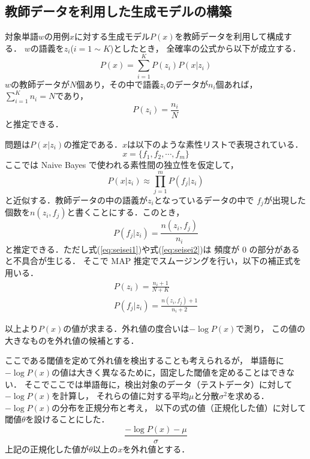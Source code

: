 \documentclass[japanese]{jnlp_1.4}
\begin{document}
\subsection{教師データを利用した生成モデルの構築}

対象単語\( w \)の用例\( x \)に対する生成モデル\( P(x) \)を教師データを利用して構成する．
\( w \)の語義を\( z_i \)(\(i=1 \sim K\))としたとき，
全確率の公式から以下が成立する．
\[
P(x) = \sum_{i=1}^K P(z_i) P(x|z_i)
\]
\( w \)の教師データが\( N \)個あり，その中で語義\( z_i \)のデータが\( n_i \)個あれば，
\( \sum_{i=1}^K n_i = N \)であり，
\begin{equation}
P(z_i) = \frac{n_i}{N}
  \label{eq:seisei1}
\end{equation}
と推定できる．

問題は\( P(x|z_i) \)の推定である．\( x \)は以下のような素性リストで表現されている．
\[
x = \{ f_1, f_2, \cdots, f_m \}
\]
ここでは Naive Bayes で使われる素性間の独立性を仮定して，
\[
P(x|z_i) \approx \prod_{j = 1}^m P(f_j | z_i)
\]
と近似する．教師データの中の語義が\( z_i \)となっているデータの中で
\( f_j \)が出現した個数を\( n(z_i,f_j) \)と書くことにする．このとき，
\begin{equation}
P(f_j | z_i) = \frac{n(z_i,f_j)}{n_i}
  \label{eq:seisei2}
\end{equation}
と推定できる．ただし式(\ref{eq:seisei1})や式(\ref{eq:seisei2})は
頻度が 0 の部分があると不具合が生じる．
そこで MAP 推定でスムージングを行い，以下の補正式を用いる\cite{takamura}．
\begin{gather}
P(z_i) = \frac{n_i + 1}{N + K} \\[0.5em]
P(f_j | z_i) = \frac{n(z_i,f_j) + 1}{n_i + 2}
\end{gather}

以上より\( P(x) \)の値が求まる．外れ値の度合いは\( - \log P(x) \)で測り，
この値の大きなものを外れ値の候補とする．

ここである閾値を定めて外れ値を検出することも考えられるが，
単語毎に\( - \log P(x) \)の値は大きく異なるために，固定した閾値を定めることはできない．
そこでここでは単語毎に，検出対象のデータ（テストデータ）に対して\( - \log P(x) \)を計算し，
それらの値に対する平均\( \mu \)と分散\( \sigma^2 \)を求める．
\( - \log P(x) \)の分布を正規分布と考え，
以下の式の値（正規化した値）に対して閾値\( \theta \)を設けることにした．
\begin{equation}
\frac{- \log P(x) - \mu}{\sigma}  \label{gtheta}
\end{equation}
上記の正規化した値が\( \theta \)以上の\( x \)を外れ値とする．
\end{document}
